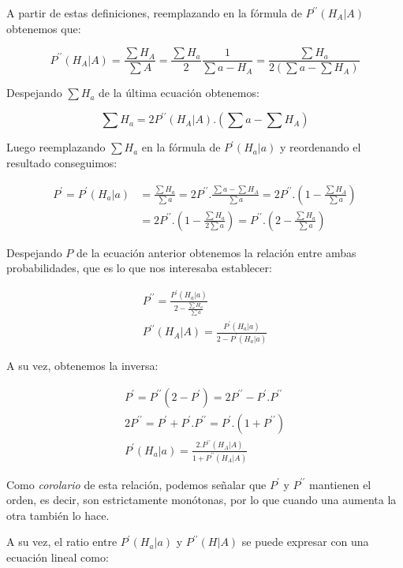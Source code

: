 \documentclass[
  spanish,
  a4paper,%
  chapterprefix=true,%
  DIV=calc,%
  twoside]{scrbook}%
\begin{document}
A partir de estas definiciones, reemplazando en la fórmula de \(P^{\prime\prime}(H_A|A)\) obtenemos que:

\[
P^{\prime\prime}(H_A|A) = \frac{\sum H_A}{\sum A} = \frac{\sum H_a}{2} \frac{1}{\sum a-H_A}=\frac{\sum H_a}{2 (\sum a- \sum H_A)}
\]

Despejando \(\sum H_a\) de la última ecuación obtenemos:

\[
\sum H_a = 2P^{\prime\prime}(H_A|A).(\sum a- \sum H_A)
\]

Luego reemplazando \(\sum H_a\) en la fórmula de \(P^\prime(H_a|a)\) y reordenando el resultado conseguimos:

\[
\begin{aligned}
P^\prime = P^\prime(H_a|a) &=\frac{\sum H_a}{\sum a} =2P^{\prime\prime}.\frac{\sum a-\sum H_A}{\sum a}=2P^{\prime\prime}.(1-\frac{\sum H_A}{\sum a})\\
&=2P^{\prime\prime}.(1-\frac{\sum H_a}{2\sum a})=P^{\prime\prime}.(2-\frac{\sum H_a}{\sum a})
\end{aligned}
\]

Despejando \(P\) de la ecuación anterior obtenemos la relación entre ambas probabilidades, que es lo que nos interesaba establecer:

\[
\begin{aligned}
P^{\prime\prime} = \frac{P^\prime(H_a|a)}{2 - \frac{\sum H_a}{\sum a} }\\
P^{\prime\prime}(H_A|A) =\frac{P^\prime(H_a|a)}{2 - P^\prime(H_a|a) } 
\end{aligned}
\]

A su vez, obtenemos la inversa:

\[
\begin{aligned}
P^\prime =P^{\prime\prime}(2-P^\prime) =2P^{\prime\prime}-P^\prime.P^{\prime\prime}\\2P^{\prime\prime} = P^\prime+P^\prime.P^{\prime\prime}=P^\prime.(1+P^{\prime\prime})\\P^\prime(H_a|a)=\frac{2.P^{\prime\prime}(H_A|A)}{1+P^{\prime\prime}(H_A|A)} 
\end{aligned}
\]

Como \emph{corolario} de esta relación, podemos señalar que \(P^\prime\) y \(P^{\prime\prime}\) mantienen el orden, es decir, son estrictamente monótonas, por lo que cuando una aumenta la otra también lo hace.

A su vez, el ratio entre \(P^\prime(H_a|a)\) y \(P^{\prime\prime}(H|A)\) se puede expresar con una ecuación lineal como:
\end{document}
